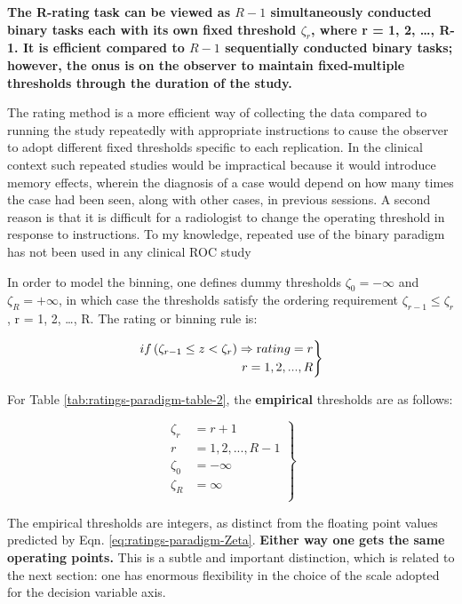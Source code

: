 \documentclass[
]{book}
\begin{document}
\textbf{The R-rating task can be viewed as \(R-1\) simultaneously conducted binary tasks each with its own fixed threshold \(\zeta_r\), where r = 1, 2, \ldots, R-1. It is efficient compared to \(R-1\) sequentially conducted binary tasks; however, the onus is on the observer to maintain fixed-multiple thresholds through the duration of the study.}

The rating method is a more efficient way of collecting the data compared to running the study repeatedly with appropriate instructions to cause the observer to adopt different fixed thresholds specific to each replication. In the clinical context such repeated studies would be impractical because it would introduce memory effects, wherein the diagnosis of a case would depend on how many times the case had been seen, along with other cases, in previous sessions. A second reason is that it is difficult for a radiologist to change the operating threshold in response to instructions. To my knowledge, repeated use of the binary paradigm has not been used in any clinical ROC study

In order to model the binning, one defines dummy thresholds \(\zeta_0 = - \infty\) and \(\zeta_R = + \infty\), in which case the thresholds satisfy the ordering requirement \(\zeta_{r-1} \le \zeta_r\) , r = 1, 2, \ldots, R. The rating or binning rule is:

\begin{equation}
\left.
\begin{aligned}  
if \left (\zeta_{r-1} \le z < \zeta_r  \right )\Rightarrow \text rating = r\\
r = 1, 2, ..., R
\end{aligned}
\right \}
\label{eq:ratings-paradigm-binningRule}
\end{equation}

For Table \ref{tab:ratings-paradigm-table-2}, the \textbf{empirical} thresholds are as follows:

\begin{equation} 
\left.
\begin{aligned}
\zeta_r &= r + 1 \\
r & = 1, 2, ..., R-1\\
\zeta_0 &= -\infty\\
\zeta_R &= \infty\\
\end{aligned}
\right \}
\label{eq:ratings-paradigm-EmpZeta}
\end{equation}

The empirical thresholds are integers, as distinct from the floating point values predicted by Eqn. \eqref{eq:ratings-paradigm-Zeta}. \textbf{Either way one gets the same operating points.} This is a subtle and important distinction, which is related to the next section: one has enormous flexibility in the choice of the scale adopted for the decision variable axis.
\end{document}
